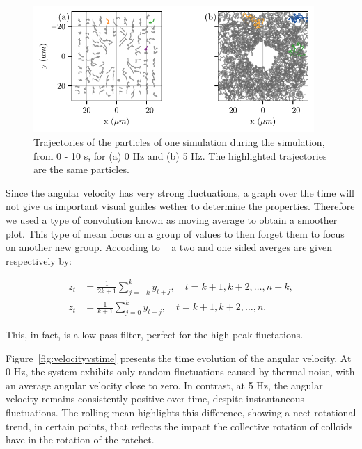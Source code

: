 \begin{figure}[h]
\begin{center}
\includegraphics[width=0.95\textwidth]{figures/parttrj.pdf}
\end{center}
\caption[Particle trajectories at different driving frequencies.]
{Trajectories of the particles of one simulation during the simulation, from 0 - 10 s, for (a) 0 Hz and (b) 5 Hz. The highlighted trajectories are the same particles.}
\label{fig:particletrj}
\end{figure}

Since the angular velocity has very strong fluctuations, a graph over the time will not give us important visual guides wether to determine the properties. Therefore we used a type of convolution known as moving average to obtain a smoother plot. This type of mean focus on a group of values to then forget them to focus on another new group. According to ~\cite{hyndman2025moving} a two and one sided averges are given respectively by:

\begin{align}
  z_t &= \frac{1}{2k+1} \sum^{k}_{j =-k} y_{t+j}, \quad t=k+1, k+2,\dots,n-k,\\
  z_t &= \frac{1}{k+1} \sum^{k}_{j =0} y_{t-j}, \quad t=k+1, k+2,\dots,n.
  \label{eq:movingaverage}
\end{align}

This, in fact, is a low-pass filter, perfect for the high peak fluctations.

Figure~\ref{fig:velocityvstime} presents the time evolution of the angular velocity. At 0 Hz, the system exhibits only random fluctuations caused by thermal noise, with an average angular velocity close to zero. In contrast, at 5 Hz, the angular velocity remains consistently positive over time, despite instantaneous fluctuations. The rolling mean highlights this difference, showing a neet rotational trend, in certain points, that reflects the impact the collective rotation of colloids have in the rotation of the ratchet.


